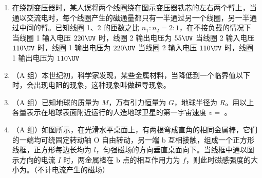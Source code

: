 \documentclass[\gkver]{gaokaozhenti}
\begin{document}
\begin{enumerate}
\item
在绕制变压器时，某人误将两个线圈绕在图示变压器铁芯的左右两个臂上，当通以交流电时，每个线圈产生的磁通量都只有一半通过另一个线圈，另一半通过中间的臂。已知线圈 1、2 的匝数之比 $n_{1}:n_{2} = 2:1$，在不接负载的情况下
\onepicture[w=3.97cm]{}
{当线圈 1 输入电压 $220\UV$ 时，线圈 2 输出电压为 $55\UV$}
{当线圈 2 输入电压 $110\UV$ 时，线圈 1 输出电压为 $220\UV$}
{当线圈 2 输入电压 $110\UV$ 时，线圈 1 输出电压为 $110\UV$}

\item
（A 组）本世纪初，科学家发现，某些金属材料，当降低到一个临界值以下时，会出现电阻的现象，这种现象叫做超导现象。

\item
（A 组）已知地球的质量为 $M$，万有引力恒量为 $G$，地球半径为 $R$。用以上各量表示在地球表面附近运行的人造地球卫星的第一宇宙速度 $v =$ 。

\item
（A 组）如图所示，在光滑水平桌面上，有两根弯成直角的相同金属棒，它们的一端均可绕固定转动轴 O 自由转动，另一端 b 互相接触，组成一个正方形线框，正方形每边长均为 $l$，匀强磁场的方向垂直桌面向下。当线框中通以图示方向的电流 $I$ 时，两金属棒在 b 点的相互作用力为 $f$，则此时磁感强度的大小为。（不计电流产生的磁场）
\onepicture[align=right, h=3.61cm]{}


\end{enumerate}
\end{document}
